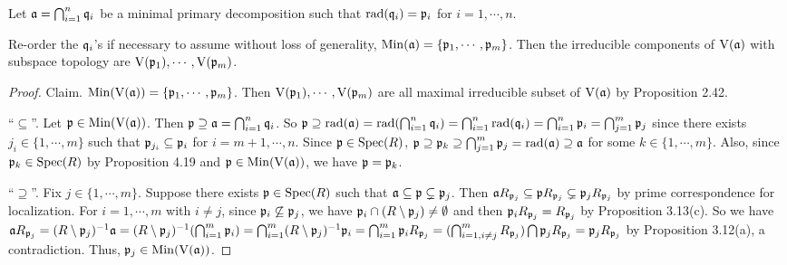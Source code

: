 \noindent Let $\mathfrak{a} = \bigcap_{i=1}^{n} \mathfrak{q}_i$ be a minimal primary decomposition such that $\operatorname{rad}(\mathfrak{q}_i) = \mathfrak{p}_i$ for $i = 1,\cdots,n$.

\begin{proposition}
    Re-order the $\mathfrak{q}_i$'s if necessary to assume without loss of generality, $\operatorname{Min}(\mathfrak{a}) = \{\mathfrak{p}_1,\cdots,\mathfrak{p}_m\}$. Then the irreducible components of $\operatorname{V}(\mathfrak{a})$ with subspace topology are $\operatorname{V}(\mathfrak{p}_1),\cdots,\operatorname{V}(\mathfrak{p}_m)$.
\end{proposition}

\begin{proof}
    Claim. $\operatorname{Min}(\operatorname{V}(\mathfrak{a})) = \{\mathfrak{p}_1,\cdots,\mathfrak{p}_m\}$. Then $\operatorname{V}(\mathfrak{p}_1),\cdots,\operatorname{V}(\mathfrak{p}_m)$ are all maximal irreducible subset of $\operatorname{V}(\mathfrak{a})$ by Proposition 2.42. \par
    ``$\subseteq$''. Let $\mathfrak{p} \in \operatorname{Min}(\operatorname{V}(\mathfrak{a}))$. Then $\mathfrak{p} \supseteq \mathfrak{a} = \bigcap_{i=1}^{n} \mathfrak{q}_i$. So $\mathfrak{p} \supseteq \operatorname{rad}(\mathfrak{a}) = \operatorname{rad}(\bigcap_{i=1}^{n}\mathfrak{q}_i) = \bigcap_{i=1}^{n} \operatorname{rad}(\mathfrak{q}_i) = \bigcap_{i=1}^{n} \mathfrak{p}_i = \bigcap_{j=1}^{m} \mathfrak{p}_j$ since there exists $j_i \in \{1,\cdots,m\}$ such that $\mathfrak{p}_{j_i} \subseteq \mathfrak{p}_i$ for $i = m+1,\cdots,n$. Since $\mathfrak{p} \in \operatorname{Spec}(R)$, $\mathfrak{p} \supseteq \mathfrak{p}_k \supseteq \bigcap_{j=1}^{m} \mathfrak{p}_j = \operatorname{rad}(\mathfrak{a}) \supseteq \mathfrak{a}$ for some $k \in \{1,\cdots,m\}$. Also, since $\mathfrak{p}_k \in \operatorname{Spec}(R)$ by Proposition 4.19 and $\mathfrak{p} \in \operatorname{Min}(\operatorname{V}(\mathfrak{a}))$, we have $\mathfrak{p} = \mathfrak{p}_k$. \par 
    ``$\supseteq$''. Fix $j \in \{1,\cdots,m\}$. Suppose there exists $\mathfrak{p} \in \operatorname{Spec}(R)$ such that $\mathfrak{a} \subseteq \mathfrak{p} \subsetneq \mathfrak{p}_j$. Then $\mathfrak{a} R_{\mathfrak{p}_j} \subseteq \mathfrak{p} R_{\mathfrak{p}_j} \subsetneq \mathfrak{p}_jR_{\mathfrak{p}_j}$ by prime correspondence for localization. For $i = 1,\cdots,m$ with $i \neq j$, since $\mathfrak{p}_i \not \subseteq \mathfrak{p}_j$, we have $\mathfrak{p}_i \cap (R \setminus \mathfrak{p}_j) \neq \emptyset$ and then $\mathfrak{p}_i R_{\mathfrak{p}_j} = R_{\mathfrak{p}_j}$ by Proposition 3.13(c). So we have $\mathfrak{a} R_{\mathfrak{p}_j} = (R \setminus \mathfrak{p}_j)^{-1} \mathfrak{a} = (R \setminus \mathfrak{p}_j)^{-1} (\bigcap_{i=1}^{m} \mathfrak{p}_i) = \bigcap_{i=1}^{m} (R \setminus \mathfrak{p}_j)^{-1} \mathfrak{p}_i = \bigcap_{i=1}^{m} \mathfrak{p}_i R_{\mathfrak{p}_j} = (\bigcap_{i=1,i \neq j}^{m} R_{\mathfrak{p}_j}) \bigcap \mathfrak{p}_jR_{\mathfrak{p}_j} = \mathfrak{p}_jR_{\mathfrak{p}_j}$ by Proposition 3.12(a), a contradiction. Thus, $\mathfrak{p}_j \in \operatorname{Min}(\operatorname{V}(\mathfrak{a}))$.
\end{proof}

